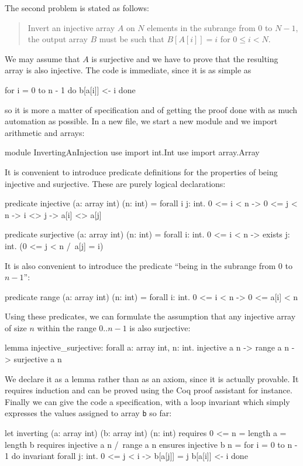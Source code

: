 The second problem is stated as follows:
\begin{quote}
  Invert an injective array $A$ on $N$ elements in the
  subrange from $0$ to $N - 1$, \ie the output array $B$ must be
  such that $B[A[i]] = i$ for $0 \le i < N$.
\end{quote}
We may assume that $A$ is surjective and we have to prove
that the resulting array is also injective.
The code is immediate, since it is as simple as
\begin{whycode}
    for i = 0 to n - 1 do b[a[i]] <- i done
\end{whycode}
so it is more a matter of specification and of getting the proof done
with as much automation as possible. In a new file, we start a new
module and we import arithmetic and arrays:
\begin{whycode}
module InvertingAnInjection
  use import int.Int
  use import array.Array
\end{whycode}
It is convenient to introduce predicate definitions for the properties
of being injective and surjective. These are purely logical
declarations:
\begin{whycode}
  predicate injective (a: array int) (n: int) =
    forall i j: int. 0 <= i < n -> 0 <= j < n -> i <> j -> a[i] <> a[j]

  predicate surjective (a: array int) (n: int) =
    forall i: int. 0 <= i < n -> exists j: int. (0 <= j < n /\ a[j] = i)
\end{whycode}
It is also convenient to introduce the predicate ``being in the
subrange from 0 to $n-1$'':
\begin{whycode}
  predicate range (a: array int) (n: int) =
    forall i: int. 0 <= i < n -> 0 <= a[i] < n
\end{whycode}
Using these predicates, we can formulate the assumption that any
injective array of size $n$ within the range $0..n-1$ is also surjective:
\begin{whycode}
  lemma injective_surjective:
    forall a: array int, n: int.
      injective a n -> range a n -> surjective a n
\end{whycode}
We declare it as a lemma rather than as an axiom, since it is actually
provable. It requires induction and can be proved using the Coq proof
assistant for instance.
Finally we can give the code a specification, with a loop invariant
which simply expresses the values assigned to array \texttt{b} so far:
\begin{whycode}
  let inverting (a: array int) (b: array int) (n: int)
    requires { 0 <= n = length a = length b }
    requires { injective a n /\ range a n }
    ensures  { injective b n }
  = for i = 0 to n - 1 do
      invariant { forall j: int. 0 <= j < i -> b[a[j]] = j }
      b[a[i]] <- i
    done
\end{whycode}
